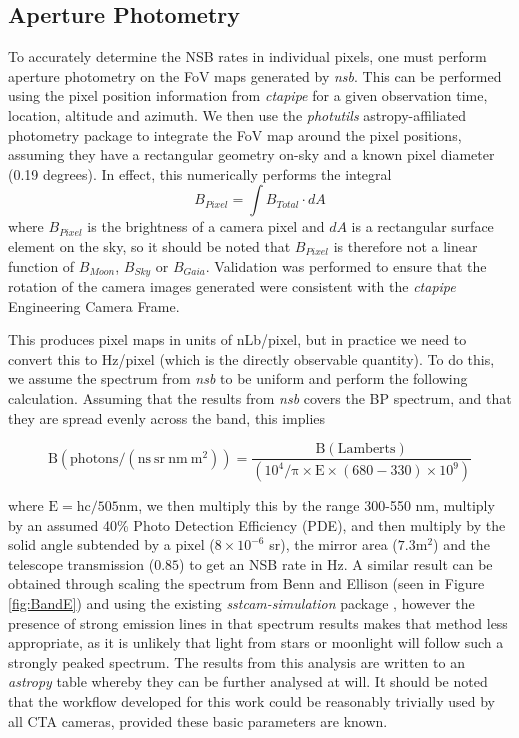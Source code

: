 \subsection{Aperture Photometry}
To accurately determine the NSB rates in individual pixels, one must perform aperture photometry on the FoV maps generated by \textit{nsb}. This can be performed using the pixel position information from \textit{ctapipe} \cite{ctapipe2} for a given observation time, location, altitude and azimuth. We then use the \textit{photutils} astropy-affiliated \cite{astropy:2018} photometry package \cite{photutils} to integrate the FoV map around the pixel positions, assuming they have a rectangular geometry on-sky and a known pixel diameter (0.19 degrees). In effect, this numerically performs the integral
\begin{equation}
    B_{Pixel}=\int B_{Total} \cdot dA
\end{equation}
where $B_{Pixel}$ is the brightness of a camera pixel and $dA$ is a rectangular surface element on the sky, so it should be noted that $B_{Pixel}$ is therefore not a linear function of $B_{Moon}$, $B_{Sky}$ or $B_{Gaia}$. Validation was performed to ensure that the rotation of the camera images generated were consistent with the \textit{ctapipe} Engineering Camera Frame.

This produces pixel maps in units of nLb/pixel, but in practice we need to convert this to Hz/pixel (which is the directly observable quantity). To do this, we assume the spectrum from \textit{nsb} to be uniform and perform the following calculation. Assuming that the results from \textit{nsb} covers the BP spectrum, and that they are spread evenly across the band, this implies

\begin{equation}
    \mathrm{B (photons/(ns\ sr\ nm\ m^2) )=\frac{B (Lamberts)}{(10^4 / \pi \times E \times (680-330) \times 10^9)}}
\end{equation}

where $\mathrm{E=hc/505nm}$, we then multiply this by the range 300-550 nm, multiply by an assumed 40\% Photo Detection Efficiency (PDE), and then multiply by the solid angle subtended by a pixel ($8\times 10^{-6}$ sr), the mirror area ($7.3 \mathrm{m^2}$) and the telescope transmission ($0.85$) to get an NSB rate in Hz. A similar result can be obtained through scaling the spectrum from Benn and Ellison \cite{BandE} (seen in Figure \ref{fig:BandE}) and using the existing \textit{sstcam-simulation} package \cite{sstcamsimulation}, however the presence of strong emission lines in that spectrum results makes that method less appropriate, as it is unlikely that light from stars or moonlight will follow such a strongly peaked spectrum. The results from this analysis are written to an \textit{astropy} table whereby they can be further analysed at will. It should be noted that the workflow developed for this work could be reasonably trivially used by all CTA cameras, provided these basic parameters are known.

